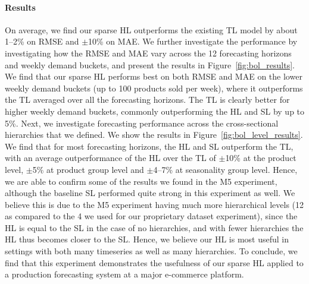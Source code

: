\documentclass[preprint, 3p, times, twocolumn]{elsarticle}
\begin{document}
  \paragraph{Results} On average, we find our sparse HL outperforms the existing TL model by about 1--2\% on RMSE and \(\pm\)10\% on MAE. We further investigate the performance by investigating how the RMSE and MAE vary across the 12 forecasting horizons and weekly demand buckets, and present the results in Figure~\ref{fig:bol_results}. We find that our sparse HL performs best on both RMSE and MAE on the lower weekly demand buckets (up to 100 products sold per week), where it outperforms the TL averaged over all the forecasting horizons. The TL is clearly better for higher weekly demand  buckets, commonly outperforming the HL and SL by up to 5\%. Next, we investigate forecasting performance across the cross-sectional hierarchies that we defined. We show the results in Figure~\ref{fig:bol_level_results}. We find that for most forecasting horizons, the HL and SL outperform the TL, with an average outperformance of the HL over the TL of \(\pm\)10\% at the  product level, \(\pm\)5\% at product group level and \(\pm\)4--7\% at seasonality group level. Hence, we are able to confirm some of the results we found in the M5 experiment, although the baseline SL performed quite strong in this experiment as well. We believe this is due to the M5 experiment having much more hierarchical levels (12 as compared to the 4 we used for our proprietary dataset experiment), since the HL is equal to the SL in the case of no hierarchies, and with fewer hierarchies the HL thus becomes closer to the SL. Hence, we believe our HL is most useful in settings with both many timeseries as well as many hierarchies.
  To conclude, we find that this experiment demonstrates the usefulness of our sparse HL applied to a production forecasting system at a major e-commerce platform.
\end{document}
